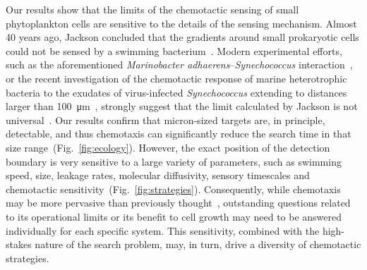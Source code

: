 \documentclass[9pt,twocolumn,twoside]{pnas-new}
\begin{document}
Our results show that the limits of the chemotactic sensing of small phytoplankton cells are sensitive to the details of the sensing mechanism. Almost 40 years ago, Jackson concluded that the gradients around small prokaryotic cells could not be sensed by a swimming bacterium~\cite{jackson1987simulating}. Modern experimental efforts, such as the aforementioned \textit{Marinobacter adhaerens}--\textit{Synechococcus} interaction~\cite{raina2023chemotaxis}, or the recent investigation of the chemotactic response of marine heterotrophic bacteria to the exudates of virus-infected \textit{Synechococcus} extending to distances larger than \SI{100}{\micro\m}~\cite{henshaw2023early}, strongly suggest that the limit calculated by Jackson is not universal~\cite{seymour2024swimming}. Our results confirm that micron-sized targets are, in principle, detectable, and thus chemotaxis can significantly reduce the search time in that size range~(Fig.~\ref{fig:ecology}). However, the exact position of the detection boundary is very sensitive to a large variety of parameters, such as swimming speed, size, leakage rates, molecular diffusivity, sensory timescales and chemotactic sensitivity~(Fig.~\ref{fig:strategies}). Consequently, while chemotaxis may be more pervasive than previously thought~\cite{seymour2024swimming}, outstanding questions related to its operational limits or its benefit to cell growth may need to be answered individually for each specific system. This sensitivity, combined with the high-stakes nature of the search problem, may, in turn, drive a diversity of chemotactic strategies.

\end{document}
